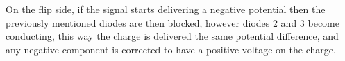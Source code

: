 \documentclass[11pt, openright]{book}
\begin{document}
On the flip side, if the signal starts delivering a negative potential then the previously mentioned diodes are then blocked, however diodes 2 and 3 become conducting, this way the charge is delivered the same potential difference, and any negative component is corrected to have a positive voltage on the charge.
\end{document}

